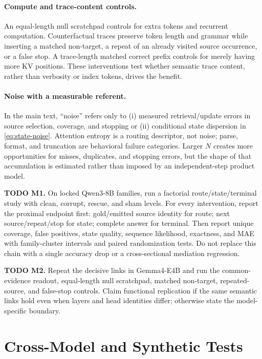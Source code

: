 \documentclass[10pt,twocolumn]{article}
\newcommand{\todoid}[2]{%
  \par\noindent\textcolor{red!75!black}{\textbf{TODO #1.} #2}\par}
\begin{document}
\paragraph{Compute and trace-content controls.}
An equal-length null scratchpad controls for extra tokens and recurrent computation.
Counterfactual traces preserve token length and grammar while inserting a matched non-target,
a repeat of an already visited source occurrence, or a false stop. A trace-length matched
correct prefix controls for merely having more KV positions. These interventions test whether
semantic trace content, rather than verbosity or index tokens, drives the benefit.

\paragraph{Noise with a measurable referent.}
In the main text, ``noise'' refers only to (i) measured retrieval/update errors in source
selection, coverage, and stopping or
(ii) conditional state dispersion in \cref{eq:state-noise}. Attention entropy is a routing
descriptor, not noise; parse, format, and truncation are behavioral failure categories.
Larger $N$ creates more opportunities for misses, duplicates, and stopping errors, but the shape
of that accumulation is estimated rather than imposed by an independent-step product model.

\todoid{M1}{On locked Qwen3-8B families, run a factorial route/state/terminal study with clean,
corrupt, rescue, and sham levels. For every intervention, report the proximal endpoint first:
gold/emitted source identity for route; next source/repeat/stop for state; complete answer for
terminal. Then report unique coverage, false positives, state quality, sequence likelihood,
exactness, and MAE with family-cluster intervals and paired randomization tests. Do not replace
this chain with a single accuracy drop or a cross-sectional mediation regression.}

\todoid{M2}{Repeat the decisive links in Gemma4-E4B and run the common-evidence readout,
equal-length null scratchpad, matched non-target, repeated-source, and false-stop controls.
Claim functional replication if the same semantic links hold even when layers and head
identities differ; otherwise state the model-specific boundary.}

\section{Cross-Model and Synthetic Tests}
\end{document}
